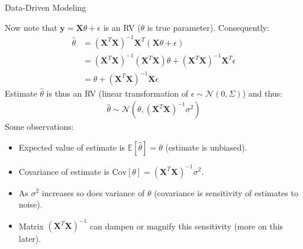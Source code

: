\documentclass[9pt]{beamer}
\begin{document}
%
\begin{frame}{Data-Driven Modeling}

Now note that $\mathbf{y}=\mathbf{X}\theta+\epsilon$ is an RV ($\theta$ is true parameter). Consequently: 
\begin{align*}
\hat{\theta}&=(\mathbf{X}^T\mathbf{X})^{-1}\mathbf{X}^T(\mathbf{X}\theta+\epsilon)\\
&=(\mathbf{X}^T\mathbf{X})^{-1}(\mathbf{X}^T\mathbf{X})\theta+(\mathbf{X}^T\mathbf{X})^{-1}\mathbf{X}^T\epsilon\\
&=\theta+(\mathbf{X}^T\mathbf{X})^{-1}\mathbf{X}\epsilon
\end{align*}
Estimate $\hat{\theta}$ is thus an RV (linear transformation of $\epsilon\sim\mathcal{N}(0,\Sigma)$)  and thus:
\begin{align*}
\hat{\theta}\sim\mathcal{N}(\theta,(\mathbf{X}^T\mathbf{X})^{-1}\sigma^2)
\end{align*}
Some observations:
\begin{itemize}
\setlength{\itemsep}{5pt}
\item Expected value of estimate is $\mathbb{E}[\hat{\theta}]=\theta$ (estimate is unbiased).
\item Covariance of estimate is $\textrm{Cov}[\theta]=(\mathbf{X}^T\mathbf{X})^{-1}\sigma^2$. 
\item As $\sigma^2$ increases so does variance of $\theta$ (covariance is sensitivity of estimates to noise).
\item Matrix $(\mathbf{X}^T\mathbf{X})^{-1}$ can dampen or magnify this sensitivity (more on this later).
\end{itemize}
\end{frame}
\end{document}
